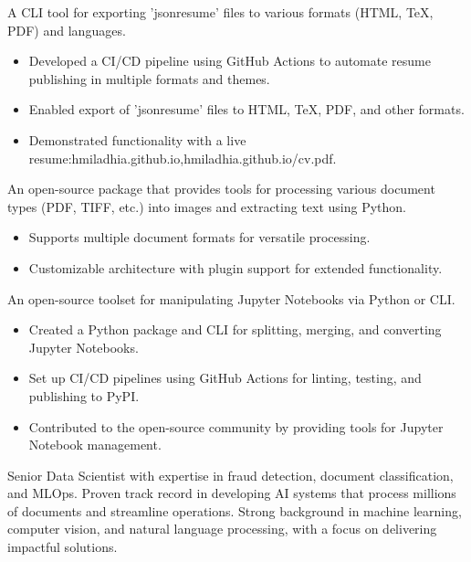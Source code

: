 \documentclass[10pt,letter,ragged2e,withhyper]{altacv}
\renewcommand{\divider}{\textcolor{body!30}{\hdashrule{\linewidth}{0.6pt}{0.5ex}}\medskip}
\begin{document}
\begin{paracol}{2}
A CLI tool for exporting 'jsonresume' files to various formats (HTML, TeX, PDF) and languages.

\begin{itemize}
      \item Developed a CI/CD pipeline using GitHub Actions to automate resume publishing in multiple formats and themes.
      \item Enabled export of 'jsonresume' files to HTML, TeX, PDF, and other formats.
      \item Demonstrated functionality with a live resume:hmiladhia.github.io,hmiladhia.github.io/cv.pdf.
  \end{itemize}

\divider
{}

An open-source package that provides tools for processing various document types (PDF, TIFF, etc.) into images and extracting text using Python.

\begin{itemize}
      \item Supports multiple document formats for versatile processing.
      \item Customizable architecture with plugin support for extended functionality.
  \end{itemize}

\divider
{}

An open-source toolset for manipulating Jupyter Notebooks via Python or CLI.

\begin{itemize}
      \item Created a Python package and CLI for splitting, merging, and converting Jupyter Notebooks.
      \item Set up CI/CD pipelines using GitHub Actions for linting, testing, and publishing to PyPI.
      \item Contributed to the open-source community by providing tools for Jupyter Notebook management.
  \end{itemize}



\switchcolumn
{}
{\small
Senior Data Scientist with expertise in fraud detection, document classification, and MLOps. 
Proven track record in developing AI systems that process millions of documents and streamline operations. 
Strong background in machine learning, computer vision, and natural language processing, with a focus on delivering impactful solutions.
}


\end{paracol}
\end{document}
